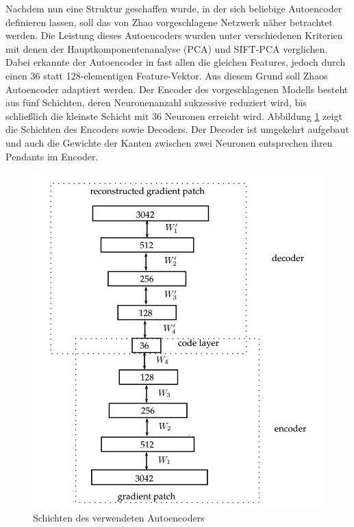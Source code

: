 Nachdem nun eine Struktur geschaffen wurde, in der sich beliebige Autoencoder definieren lassen, soll das von Zhao vorgeschlagene Netzwerk näher betrachtet werden. Die Leistung dieses Autoencoders wurden unter verschiedenen Kriterien mit denen der Hauptkomponentenanalyse (PCA) und SIFT-PCA verglichen. Dabei erkannte der Autoencoder in fast allen die gleichen Features, jedoch durch einen 36 statt 128-elementigen Feature-Vektor. Aus diesem Grund soll Zhaos Autoencoder adaptiert werden.\newline
Der Encoder des vorgeschlagenen Modells besteht aus fünf Schichten, deren Neuronenanzahl sukzessive reduziert wird, bis schließlich die kleinste Schicht mit 36 Neuronen erreicht wird. Abbildung \ref{img:ae_model} zeigt die Schichten des Encoders sowie Decoders. Der Decoder ist umgekehrt aufgebaut und auch die Gewichte der Kanten zwischen zwei Neuronen entsprechen ihren Pendants im Encoder.

\begin{figure}
	\centering
	\includegraphics[scale=0.6]{images/ae_model.png}
	\caption{Schichten des verwendeten Autoencoders \cite{aed2016}}
	\label{img:ae_model}
\end{figure}

